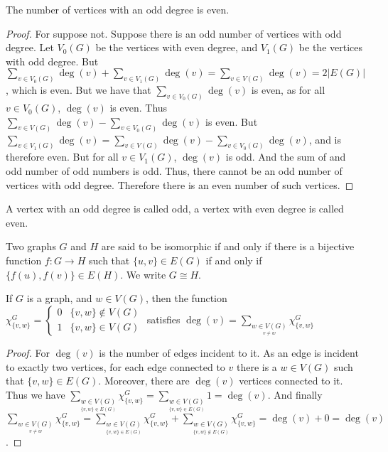 \documentclass[crop=false,class=book]{standalone}
\begin{document}
\begin{corollary}
The number of vertices with an odd degree is even.
\end{corollary}
\begin{proof}
For suppose not. Suppose there is an odd number of vertices with odd degree. Let $V_0(G)$ be the vertices with even degree, and $V_1(G)$ be the vertices with odd degree. But $\sum_{v\in V_0(G)}\deg(v) + \sum_{v\in V_1(G)} \deg(v) = \sum_{v\in V(G)}\deg(v) = 2|E(G)|$, which is even. But we have that $\sum_{v\in V_0(G)}\deg(v)$ is even, as for all $v\in V_{0}(G)$, $\deg(v)$ is even. Thus $\sum_{v\in V(G)}\deg(v) - \sum_{v\in V_0(G)}\deg(v)$ is even. But $\sum_{v\in V_1(G)}\deg(v) = \sum_{v\in V(G)}\deg(v) - \sum_{v\in V_0(G)}\deg(v)$, and is therefore even. But for all $v\in V_1(G)$, $\deg(v)$ is odd. And the sum of and odd number of odd numbers is odd. Thus, there cannot be an odd number of vertices with odd degree. Therefore there is an even number of such vertices.
\end{proof}
\begin{definition}
A vertex with an odd degree is called odd, a vertex with even degree is called even.
\end{definition}
\begin{definition}
Two graphs $G$ and $H$ are said to be isomorphic if and only if there is a bijective function $f:G\rightarrow H$ such that $\{u,v\}\in E(G)$ if and only if $\{f(u),f(v)\}\in E(H)$. We write $G \cong H$.
\end{definition}
\begin{lemma}
If $G$ is a graph, and $w\in V(G)$, then the function $\chi_{\{v,w\}}^G = \begin{cases} 0 & \{v,w\} \notin V(G) \\ 1 & \{v,w\} \in V(G) \end{cases}$ satisfies $\deg(v) = \sum_{\underset{v\ne w}{w\in V(G)}} \chi_{\{v,w\}}^G$
\end{lemma}
\begin{proof}
For $\deg(v)$ is the number of edges incident to it. As an edge is incident to exactly two vertices, for each edge connected to $v$ there is a $w\in V(G)$ such that $\{v,w\} \in E(G)$. Moreover, there are $\deg(v)$ vertices connected to it. Thus we have $\sum_{\underset{\{v,w\}\in E(G)}{w\in V(G)}} \chi_{\{v,w\}}^G = \sum_{\underset{\{v,w\}\in E(G)}{w\in V(G)}}1 = \deg(v)$. And finally $\sum_{\underset{v\ne w}{w\in V(G)}}\chi_{\{v,w\}}^G = \sum_{\underset{\{v,w\}\in E(G)}{w\in V(G)}}\chi_{\{v,w\}}^G+\sum_{\underset{\{v,w\}\notin E(G)}{w\in V(G)}}\chi_{\{v,w\}}^G = \deg(v) + 0 = \deg(v)$.
\end{proof}
\end{document}
